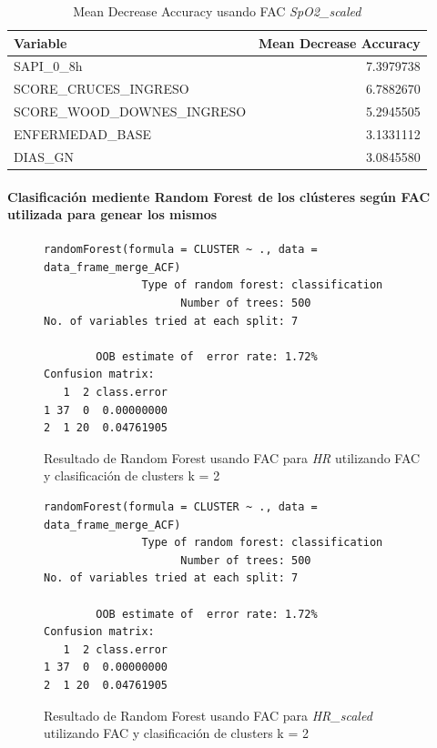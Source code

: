\begin{table}[H]
    \centering
    \begin{tabular}{lr}
        \toprule
        \textbf{Variable} & \textbf{Mean Decrease Accuracy} \\
        \midrule
        SAPI\_0\_8h & 7.3979738 \\
        SCORE\_CRUCES\_INGRESO & 6.7882670 \\
        SCORE\_WOOD\_DOWNES\_INGRESO & 5.2945505 \\
        ENFERMEDAD\_BASE & 3.1331112 \\
        DIAS\_GN & 3.0845580 \\
        \bottomrule
    \end{tabular}
    \caption{Mean Decrease Accuracy usando FAC \textit{SpO2\_scaled}}
\end{table}


\paragraph{Clasificación mediente Random Forest de los clústeres según FAC utilizada para genear los mismos} 

\begin{figure}[H]
    \centering
    \begin{lstlisting}[frame=single, basicstyle=\small\ttfamily]
        randomForest(formula = CLUSTER ~ ., data = data_frame_merge_ACF) 
               Type of random forest: classification
                     Number of trees: 500
No. of variables tried at each split: 7

        OOB estimate of  error rate: 1.72%
Confusion matrix:
   1  2 class.error
1 37  0  0.00000000
2  1 20  0.04761905
    \end{lstlisting}
    \caption{Resultado de Random Forest usando FAC para \textit{HR} utilizando FAC y clasificación de clusters k = 2}\label{fig:random_forest_acf_result_RF_1}
\end{figure}
\begin{figure}[H]
    \centering
    \begin{lstlisting}[frame=single, basicstyle=\small\ttfamily]
        randomForest(formula = CLUSTER ~ ., data = data_frame_merge_ACF) 
               Type of random forest: classification
                     Number of trees: 500
No. of variables tried at each split: 7

        OOB estimate of  error rate: 1.72%
Confusion matrix:
   1  2 class.error
1 37  0  0.00000000
2  1 20  0.04761905
    \end{lstlisting}
    \caption{Resultado de Random Forest usando FAC para \textit{HR\_scaled} utilizando FAC y clasificación de clusters k = 2}
    \label{fig:random_forest_acf_result_RF_2}
\end{figure}

